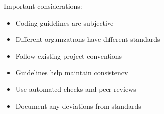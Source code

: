 \begin{remark}
Important considerations:
\begin{itemize}
  \item Coding guidelines are subjective
  \item Different organizations have different standards
  \item Follow existing project conventions
  \item Guidelines help maintain consistency
  \item Use automated checks and peer reviews
  \item Document any deviations from standards
\end{itemize}
\end{remark}